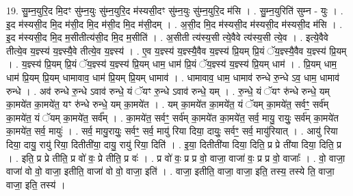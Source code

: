 \documentclass[17pt]{extarticle}
\begin{document}
19. सु॒म्न॒युरि॒द मि॒दꣳ सु॑म्न॒युः सु॑म्न॒युरि॒द म॑स्यसी॒दꣳ सु॑म्न॒युः सु॑म्न॒युरि॒द म॑सि । . सु॒म्न॒युरिति॑ सुम्न - युः । . इ॒द म॑स्यसी॒द मि॒द म॑सी॒द मि॒द म॑सी॒द मि॒द म॑सी॒दम् । . अ॒सी॒द मि॒द म॑स्यसी॒द म॑स्यसी॒द म॑स्यसी॒द म॑सि । . इ॒द म॑स्यसी॒द मि॒द म॒सीतीत्य॑सी॒द मि॒द म॒सीति॑ । . अ॒सीती त्य॑स्य॒सी त्ये॒वैवे त्य॑स्य॒सी त्ये॒व । . इत्ये॒वैवे तीत्ये॒व य॒ज्ञ्स्य॑ य॒ज्ञ्स्यै॒वे तीत्ये॒व य॒ज्ञ्स्य॑ । . ए॒व य॒ज्ञ्स्य॑ य॒ज्ञ्स्यै॒वैव य॒ज्ञ्स्य॑ प्रि॒यम् प्रि॒यं ॅय॒ज्ञ्स्यै॒वैव य॒ज्ञ्स्य॑ प्रि॒यम् । . य॒ज्ञ्स्य॑ प्रि॒यम् प्रि॒यं ॅय॒ज्ञ्स्य॑ य॒ज्ञ्स्य॑ प्रि॒यम् धाम॒ धाम॑ प्रि॒यं ॅय॒ज्ञ्स्य॑ य॒ज्ञ्स्य॑ प्रि॒यम् धाम॑ । . प्रि॒यम् धाम॒ धाम॑ प्रि॒यम् प्रि॒यम् धामावाव॒ धाम॑ प्रि॒यम् प्रि॒यम् धामाव॑ । . धामावाव॒ धाम॒ धामाव॑ रुन्धे रु॒न्धे ऽव॒ धाम॒ धामाव॑ रुन्धे । . अव॑ रुन्धे रु॒न्धे ऽवाव॑ रुन्धे॒ यं ॅयꣳ रु॒न्धे ऽवाव॑ रुन्धे॒ यम् । . रु॒न्धे॒ यं ॅयꣳ रु॑न्धे रुन्धे॒ यम् का॒मये॑त का॒मये॑त॒ यꣳ रु॑न्धे रुन्धे॒ यम् का॒मये॑त । . यम् का॒मये॑त का॒मये॑त॒ यं ॅयम् का॒मये॑त॒ सर्वꣳ॒॒ सर्व॑म् का॒मये॑त॒ यं ॅयम् का॒मये॑त॒ सर्व᳚म् । . का॒मये॑त॒ सर्वꣳ॒॒ सर्व॑म् का॒मये॑त का॒मये॑त॒ सर्व॒ मायु॒ रायुः॒ सर्व॑म् का॒मये॑त का॒मये॑त॒ सर्व॒ मायुः॑ । . सर्व॒ मायु॒रायुः॒ सर्वꣳ॒॒ सर्व॒ मायु॑ रिया दिया॒ दायुः॒ सर्वꣳ॒॒ सर्व॒ मायु॑रियात् । . आयु॑ रिया दिया॒ दायु॒ रायु॑ रिया॒ दितीती॑या॒ दायु॒ रायु॑ रिया॒ दिति॑ । . इ॒या॒ दितीती॑या दिया॒ दिति॒ प्र प्रे ती॑या दिया॒ दिति॒ प्र । . इति॒ प्र प्रे तीति॒ प्र वो॑ वः॒ प्रे तीति॒ प्र वः॑ । . प्र वो॑ वः॒ प्र प्र वो॒ वाजा॒ वाजा॑ वः॒ प्र प्र वो॒ वाजाः᳚ । . वो॒ वाजा॒ वाजा॑ वो वो॒ वाजा॒ इतीति॒ वाजा॑ वो वो॒ वाजा॒ इति॑ । . वाजा॒ इतीति॒ वाजा॒ वाजा॒ इति॒ तस्य॒ तस्ये ति॒ वाजा॒ वाजा॒ इति॒ तस्य॑ । \newline
\end{document}
